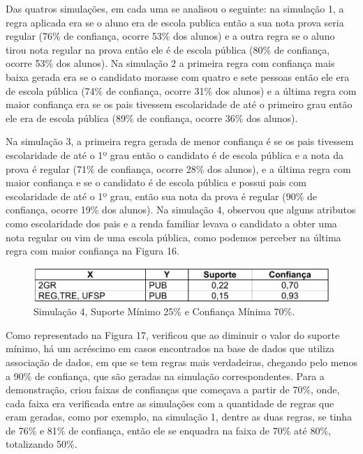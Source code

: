 \par
Das quatros simulações, em cada uma se analisou o seguinte: na simulação 1, a regra aplicada era se o aluno era de escola publica então a sua nota prova seria regular (76\% de confiança, ocorre 53\% dos alunos) e a outra regra se o aluno tirou nota regular na prova então ele é de escola pública (80\% de confiança, ocorre 53\% dos alunos). Na simulação 2 a primeira regra com confiança mais baixa gerada era se o candidato morasse com quatro e sete pessoas então ele era de escola pública (74\% de confiança, ocorre 31\% dos alunos) e a última regra com maior confiança era se os pais tivessem escolaridade de até o primeiro grau então ele era de escola pública (89\% de confiança, ocorre 36\% dos alunos).

\par
Na simulação 3, a primeira regra gerada de menor confiança é se os pais tivessem escolaridade de até o 1º grau então o candidato é de escola pública e a nota da prova é regular (71\% de confiança, ocorre 28\% dos alunos), e a última regra com maior confiança e se o candidato é de escola pública e possui pais com escolaridade de até o 1º grau, então sua nota da prova é regular (90\% de confiança, ocorre 19\% dos alunos). Na simulação 4,  observou que alguns atributos como escolaridade dos pais e a renda familiar levava o candidato a obter uma nota regular ou vim de uma escola pública, como podemos perceber na última regra com maior confiança na Figura 16.


\begin{figure}[!htp]
	\begin{center}
    \caption{\label{fig:waveform_fig} Simulação 4, Suporte Mínimo 25\% e Confiança Mínima 70\%.}
	\includegraphics[scale=0.49]{Figuras/Simulacao_quatro.png}
	\end{center}
\end{figure}

\par
Como representado na Figura 17,  verificou que ao diminuir o valor do suporte mínimo, há um acréscimo em casos encontrados na base de dados que utiliza associação de dados, em que se tem regras mais verdadeiras, chegando pelo menos a 90\% de confiança, que são geradas na simulação correspondentes. Para a demonstração,  criou faixas de confianças que começava a partir de 70\%, onde, cada faixa era verificada entre as simulações com a quantidade de regras que eram geradas, como por exemplo, na simulação 1, dentre as duas regras, se tinha de 76\% e 81\% de confiança, então ele se enquadra na faixa de 70\% até 80\%, totalizando 50\%.

